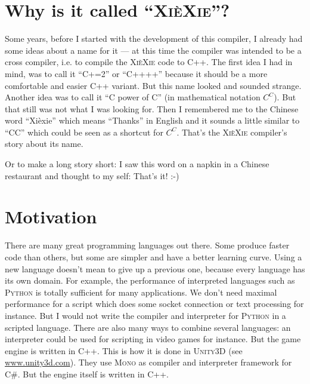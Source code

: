 \documentclass{report}
\def\xiexie{\textsc{Xi\`eXie}\xspace}
\def\cpp{\textsc{C++}\xspace}
\def\python{\textsc{Python}\xspace}
\begin{document}

\section{Why is it called ``\xiexie''?}

Some years, before I started with the development of this compiler, I already had some ideas about a name for it
--- at this time the compiler was intended to be a cross compiler, i.e. to compile the \xiexie code to \cpp.
The first idea I had in mind, was to call it ``C+=2'' or ``C++++'' because it should be a more comfortable and easier
\cpp variant. But this name looked and sounded strange. Another idea was to call it ``C power of C''
(in mathematical notation $C^C$). But that still was not what I was looking for.
Then I remembered me to the Chinese word ``Xi\`exie'' which means ``Thanks'' in English and it sounds a little
similar to ``CC'' which could be seen as a shortcut for $C^C$. That's the \xiexie compiler's story about its name.

Or to make a long story short: I saw this word on a napkin in a Chinese restaurant and thought to my self: That's it! :-)



\section{Motivation}

There are many great programming languages out there. Some produce faster code than others, but some
are simpler and have a better learning curve. Using a new language doesn't mean to give up a previous one,
because every language has its own domain. For example, the performance of interpreted languages such as \python
is totally sufficient for many applications. We don't need maximal performance for a script which does some
socket connection or text processing for instance.
But I would not write the compiler and interpreter for \python in a scripted language.
There are also many ways to combine several languages: an interpreter could be used for scripting in video games
for instance. But the game engine is written in \cpp.
This is how it is done in \textsc{Unity3D} (see \href{http://www.unity3d.com/}{www.unity3d.com}).
They use \textsc{Mono} as compiler and interpreter framework for \textsc{C\#}. But the engine itself is written in \cpp.
\end{document}
